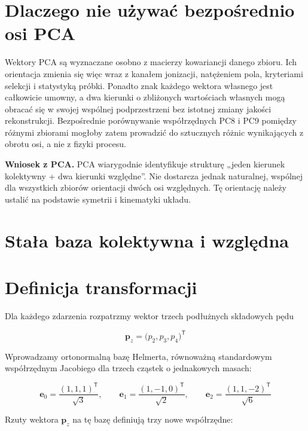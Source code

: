 \documentclass[12pt,letterpaper,oneside]{report}
\numberwithin{equation}{chapter}
\numberwithin{figure}{chapter}
\numberwithin{table}{chapter}
\newenvironment{importantbox}[1]
  {\par\medskip\noindent\textbf{#1.}\quad}
  {\par\medskip}
\begin{document}
\section{Dlaczego nie używać bezpośrednio osi PCA}

Wektory PCA są wyznaczane osobno z macierzy kowariancji danego zbioru.
Ich orientacja zmienia się więc wraz z kanałem jonizacji, natężeniem
pola, kryteriami selekcji i statystyką próbki. Ponadto znak każdego
wektora własnego jest całkowicie umowny, a dwa kierunki o zbliżonych
wartościach własnych mogą obracać się w swojej wspólnej podprzestrzeni
bez istotnej zmiany jakości rekonstrukcji. Bezpośrednie porównywanie
współrzędnych PC8 i PC9 pomiędzy różnymi zbiorami mogłoby zatem
prowadzić do sztucznych różnic wynikających z obrotu osi, a nie z fizyki
procesu.

\begin{importantbox}{Wniosek z PCA}
PCA wiarygodnie identyfikuje strukturę „jeden kierunek kolektywny + dwa
kierunki względne''. Nie dostarcza jednak naturalnej, wspólnej dla
wszystkich zbiorów orientacji dwóch osi względnych. Tę orientację należy
ustalić na podstawie symetrii i kinematyki układu.
\end{importantbox}

\section{Stała baza kolektywna i względna}

\section{Definicja transformacji}

Dla każdego zdarzenia rozpatrzmy wektor trzech podłużnych składowych
pędu

\begin{equation}
\mathbf{p}_z=\bigl(p_2,p_3,p_4\bigr)^{\mathsf T}
\label{eq:5}
\end{equation}

Wprowadzamy ortonormalną bazę Helmerta, równoważną standardowym
współrzędnym Jacobiego dla trzech cząstek o jednakowych masach:

\begin{equation}
\mathbf e_0=\frac{(1,1,1)^{\mathsf T}}{\sqrt3},\qquad \mathbf e_1=\frac{(1,-1,0)^{\mathsf T}}{\sqrt2},\qquad \mathbf e_2=\frac{(1,1,-2)^{\mathsf T}}{\sqrt6}
\label{eq:6}
\end{equation}

Rzuty wektora \ensuremath{\mathbf p_z} na tę bazę definiują trzy nowe współrzędne:
\end{document}
